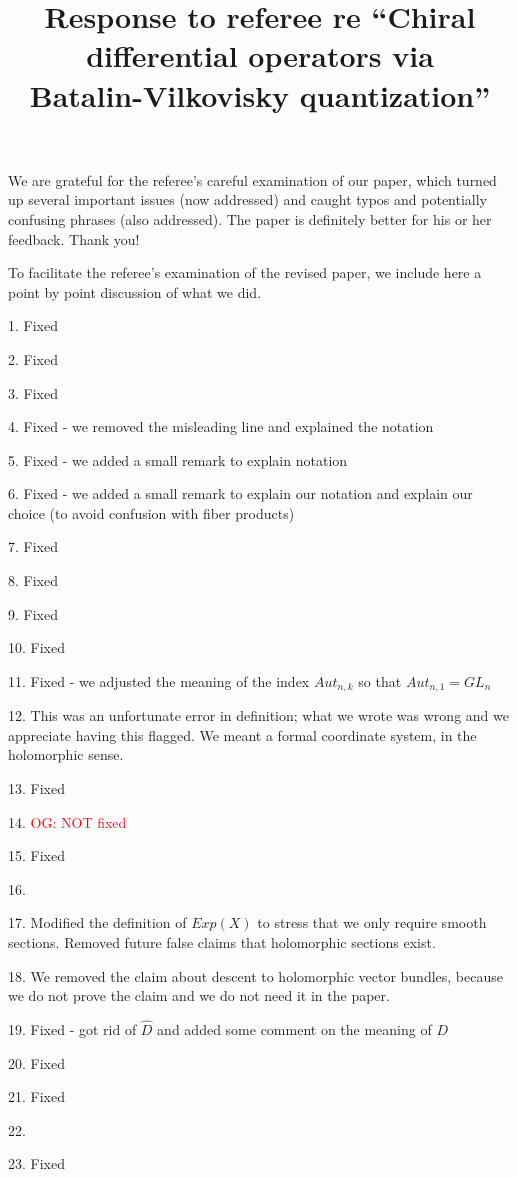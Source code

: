 \documentclass[10pt]{amsart}
\title{Response to referee re ``Chiral differential operators via\\Batalin-Vilkovisky quantization''}
\def\owen{\textcolor{red}{OG: }\textcolor{red}}
\begin{document}
\maketitle

We are grateful for the referee's careful examination of our paper, which turned up several important issues (now addressed) and caught typos and potentially confusing phrases (also addressed).
The paper is definitely better for his or her feedback.
Thank you!

To facilitate the referee's examination of the revised paper, 
we include here a point by point discussion of what we did.

1. Fixed

2. Fixed

3. Fixed

4. Fixed - we removed the misleading line and explained the notation

5. Fixed - we added a small remark to explain notation

6. Fixed - we added a small remark to explain our notation and explain our choice (to avoid confusion with fiber products)

7. Fixed

8. Fixed

9. Fixed

10. Fixed

11. Fixed - we adjusted the meaning of the index $Aut_{n,k}$ so that $Aut_{n,1} = GL_n$

12. This was an unfortunate error in definition; what we wrote was wrong and we appreciate having this flagged. We meant a formal coordinate system, in the holomorphic sense. 

13. Fixed

14. \owen{NOT fixed}

15. Fixed

16.

17. Modified the definition of $Exp(X)$ to stress that we only require smooth sections. 
Removed future false claims that holomorphic sections exist.

18. We removed the claim about descent to holomorphic vector bundles, because we do not prove the claim and we do not need it in the paper.

19. Fixed - got rid of $\hat{D}$ and added some comment on the meaning of $D$

20. Fixed

21. Fixed

22.

23. Fixed
\end{document}
